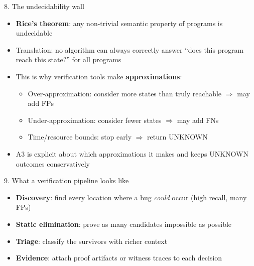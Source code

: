 \documentclass[aspectratio=169]{beamer}
\begin{document}
\begin{frame}{8. The undecidability wall}
\begin{itemize}
  \item \textbf{Rice's theorem}: any non-trivial semantic property of programs is undecidable
  \item Translation: no algorithm can always correctly answer ``does this program reach this state?'' for all programs
  \item This is why verification tools make \textbf{approximations}:
    \begin{itemize}
      \item Over-approximation: consider more states than truly reachable $\Rightarrow$ may add FPs
      \item Under-approximation: consider fewer states $\Rightarrow$ may add FNs
      \item Time/resource bounds: stop early $\Rightarrow$ return UNKNOWN
    \end{itemize}
  \item A3 is explicit about which approximations it makes and keeps UNKNOWN outcomes conservatively
\end{itemize}
\end{frame}

\begin{frame}[shrink=15]{9. What a verification pipeline looks like}
\begin{center}
%
\end{center}
\begin{itemize}
  \item \textbf{Discovery}: find every location where a bug \emph{could} occur (high recall, many FPs)
  \item \textbf{Static elimination}: prove as many candidates impossible as possible
  \item \textbf{Triage}: classify the survivors with richer context
  \item \textbf{Evidence}: attach proof artifacts or witness traces to each decision
\end{itemize}
\end{frame}
\end{document}
